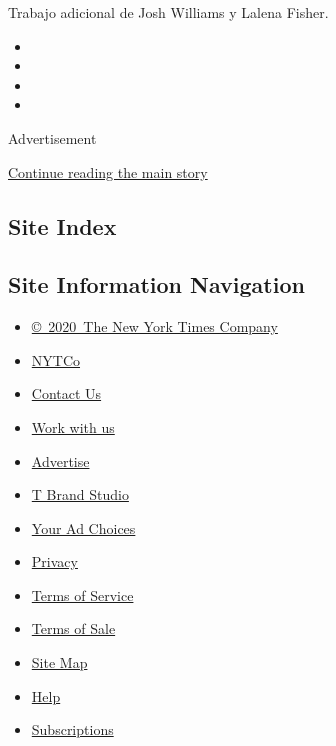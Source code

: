 Trabajo adicional de Josh Williams y Lalena Fisher.

\begin{itemize}
\item
\item
\item
\item
\end{itemize}

Advertisement

\protect\hyperlink{after-bottom}{Continue reading the main story}

\hypertarget{site-index}{%
\subsection{Site Index}\label{site-index}}

\hypertarget{site-information-navigation}{%
\subsection{Site Information
Navigation}\label{site-information-navigation}}

\begin{itemize}
\tightlist
\item
  \href{https://help.nytimes3xbfgragh.onion/hc/en-us/articles/115014792127-Copyright-notice}{©~2020~The
  New York Times Company}
\end{itemize}

\begin{itemize}
\tightlist
\item
  \href{https://www.nytco.com/}{NYTCo}
\item
  \href{https://help.nytimes3xbfgragh.onion/hc/en-us/articles/115015385887-Contact-Us}{Contact
  Us}
\item
  \href{https://www.nytco.com/careers/}{Work with us}
\item
  \href{https://nytmediakit.com/}{Advertise}
\item
  \href{http://www.tbrandstudio.com/}{T Brand Studio}
\item
  \href{https://www.nytimes3xbfgragh.onion/privacy/cookie-policy\#how-do-i-manage-trackers}{Your
  Ad Choices}
\item
  \href{https://www.nytimes3xbfgragh.onion/privacy}{Privacy}
\item
  \href{https://help.nytimes3xbfgragh.onion/hc/en-us/articles/115014893428-Terms-of-service}{Terms
  of Service}
\item
  \href{https://help.nytimes3xbfgragh.onion/hc/en-us/articles/115014893968-Terms-of-sale}{Terms
  of Sale}
\item
  \href{https://spiderbites.nytimes3xbfgragh.onion}{Site Map}
\item
  \href{https://help.nytimes3xbfgragh.onion/hc/en-us}{Help}
\item
  \href{https://www.nytimes3xbfgragh.onion/subscription?campaignId=37WXW}{Subscriptions}
\end{itemize}
